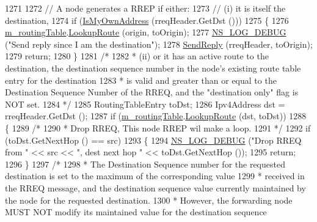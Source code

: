 \begin{DoxyCode}
1271 
1272   \textcolor{comment}{//  A node generates a RREP if either:}
1273   \textcolor{comment}{//  (i)  it is itself the destination,}
1274   \textcolor{keywordflow}{if} (\hyperlink{classns3_1_1aodv_1_1RoutingProtocol_a822621de276958cf1d22fb3be536bb49}{IsMyOwnAddress} (rreqHeader.GetDst ()))
1275     \{
1276       \hyperlink{classns3_1_1aodv_1_1RoutingProtocol_a4e1003a34c8adc96db71096d88c98ae0}{m\_routingTable}.\hyperlink{classns3_1_1aodv_1_1RoutingTable_a90cbc8a2c65cd68ccdaf768fcbb5d723}{LookupRoute} (origin, toOrigin);
1277       \hyperlink{group__logging_ga413f1886406d49f59a6a0a89b77b4d0a}{NS\_LOG\_DEBUG} (\textcolor{stringliteral}{"Send reply since I am the destination"});
1278       \hyperlink{classns3_1_1aodv_1_1RoutingProtocol_a39c60e597085c4abc690e6215d302a1f}{SendReply} (rreqHeader, toOrigin);
1279       \textcolor{keywordflow}{return};
1280     \}
1281   \textcolor{comment}{/*}
1282 \textcolor{comment}{   * (ii) or it has an active route to the destination, the destination sequence number in the node's
       existing route table entry for the destination}
1283 \textcolor{comment}{   *      is valid and greater than or equal to the Destination Sequence Number of the RREQ, and the
       "destination only" flag is NOT set.}
1284 \textcolor{comment}{   */}
1285   RoutingTableEntry toDst;
1286   Ipv4Address dst = rreqHeader.GetDst ();
1287   \textcolor{keywordflow}{if} (\hyperlink{classns3_1_1aodv_1_1RoutingProtocol_a4e1003a34c8adc96db71096d88c98ae0}{m\_routingTable}.\hyperlink{classns3_1_1aodv_1_1RoutingTable_a90cbc8a2c65cd68ccdaf768fcbb5d723}{LookupRoute} (dst, toDst))
1288     \{
1289       \textcolor{comment}{/*}
1290 \textcolor{comment}{       * Drop RREQ, This node RREP wil make a loop.}
1291 \textcolor{comment}{       */}
1292       \textcolor{keywordflow}{if} (toDst.GetNextHop () == src)
1293         \{
1294           \hyperlink{group__logging_ga413f1886406d49f59a6a0a89b77b4d0a}{NS\_LOG\_DEBUG} (\textcolor{stringliteral}{"Drop RREQ from "} << src << \textcolor{stringliteral}{", dest next hop "} << toDst.GetNextHop ());
1295           \textcolor{keywordflow}{return};
1296         \}
1297       \textcolor{comment}{/*}
1298 \textcolor{comment}{       * The Destination Sequence number for the requested destination is set to the maximum of the
       corresponding value}
1299 \textcolor{comment}{       * received in the RREQ message, and the destination sequence value currently maintained by the node
       for the requested destination.}
1300 \textcolor{comment}{       * However, the forwarding node MUST NOT modify its maintained value for the destination sequence
}
\end{DoxyCode}
